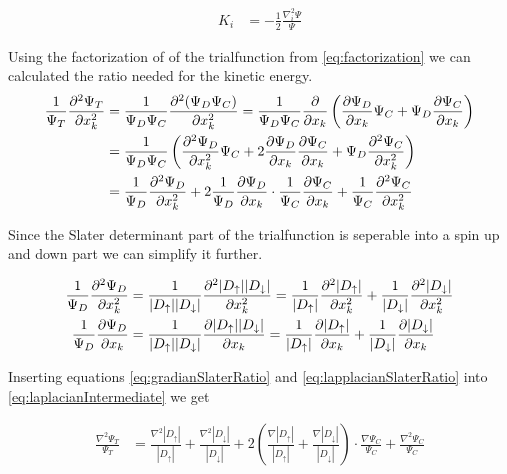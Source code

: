 \documentclass[11pt]{article}
\begin{document}
		\begin{align}
			K_i &= - \frac{1}{2} \frac{\nabla^2_i \Psi}{\Psi}
		\end{align}

			Using the factorization of of the trialfunction from \eqref{eq:factorization} we can calculated the ratio needed for the kinetic energy.
		\begin{align}
			\frac{1}{\Psi_T}\pdv[2]{\Psi_T}{x_k} &= \frac{1}{\Psi_D\Psi_C} \pdv[2]{(\Psi_D\Psi_C)}{x_k} = \frac{1}{\Psi_D\Psi_C} \pdv{}{x_k} \left( \pdv{\Psi_D}{x_k} \Psi_C +\Psi_D \pdv{\Psi_C}{x_k} \right)
			\\
			&= \frac{ 1 }{\Psi_D\Psi_C} \left( \pdv[2]{\Psi_D}{x_k} \Psi_C   + 2 \pdv{ \Psi_D }{x_k}\pdv{ \Psi_C }{x_k} + \Psi_D\pdv[2]{\Psi_C}{x_k} \right)
			\\
			&= \frac{1}{\Psi_D}\pdv[2]{\Psi_D}{x_k}  + 2 \frac{1}{\Psi_D} \pdv{ \Psi_D }{x_k} \cdot \frac{1}{\Psi_C}\pdv{ \Psi_C }{x_k} +  \frac{1}{\Psi_C}\pdv[2]{\Psi_C}{x_k} \label{eq:laplacianIntermediate}
		\end{align}

		Since the Slater determinant part of the trialfunction is seperable into a spin up and down part we can simplify it further.

		\begin{align}
			\frac{1}{\Psi_D}\pdv[2]{\Psi_D}{x_k} &= \frac{1}{|D_\uparrow| |D_\downarrow|} \pdv[2]{ |D_\uparrow| |D_\downarrow| }{x_k}
			= \frac{1}{|D_\uparrow|} \pdv[2]{|D_\uparrow|}{x_k} + \frac{1}{|D_\downarrow|} \pdv[2]{|D_\downarrow|}{x_k} \label{eq:lapplacianSlaterRatio}
			\\
			\frac{1}{\Psi_D} \pdv{ \Psi_D }{x_k}  &=  \frac{1}{|D_\uparrow| |D_\downarrow|} \pdv{ |D_\uparrow| |D_\downarrow| }{x_k}
			= \frac{1}{|D_\uparrow|} \pdv{|D_\uparrow|}{x_k} + \frac{1}{|D_\downarrow|} \pdv{|D_\downarrow|}{x_k} \label{eq:gradianSlaterRatio}
		\end{align}

		Inserting equations \eqref{eq:gradianSlaterRatio} and \eqref{eq:lapplacianSlaterRatio} into \eqref{eq:laplacianIntermediate} we get

		\begin{align}
			\frac{\nabla^2 \Psi_T}{\Psi_T} &= \frac{\nabla^2 |D_\uparrow|}{|D_\uparrow|} + \frac{\nabla^2 |D_\downarrow|}{|D_\downarrow|} + 2 \left( \frac{\nabla |D_\uparrow|}{|D_\uparrow|} + \frac{\nabla |D_\downarrow|}{|D_\downarrow|} \right) \cdot \frac{\nabla\Psi_C}{\Psi_C} +  \frac{\nabla^2\Psi_C}{\Psi_C}
		\end{align}
\end{document}
